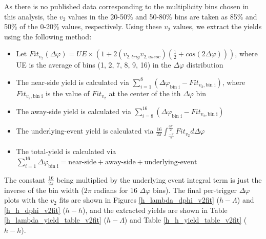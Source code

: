 \documentclass[ALICE,manyauthors]{ALICE_analysis_notes}
\begin{document}
As there is no published data corresponding to the multiplicity bins chosen in this analysis, the $v_{2}$ values in the 20-50\% and 50-80\% bins are taken as 85\% and 50\% of the 0-20\% values, respectively. Using these $v_{2}$ values, we extract the yields using the following method:

\begin{itemize}
\item Let $Fit_{v_{2}}(\Delta\varphi) = UE\times(1 + 2(v_{2, trig}v_{2, assoc})(\frac{1}{2} + cos(2\Delta\varphi)))$, where UE is the average of bins (1, 2, 7, 8, 9, 16) in the $\Delta\varphi$ distribution
\item The near-side yield is calculated via $\sum_{i=1}^{8} (\Delta\varphi_\text{bin i} - Fit_{v_{2}, \text{bin i}})$, where $Fit_{v_{2}, \text{bin i}}$ is the value of $Fit_{v_{2}}$ at the center of the ith $\Delta\varphi$ bin
\item The away-side yield is calculated via $\sum_{i=8}^{16} (\Delta\varphi_\text{bin i} - Fit_{v_{2}, \text{bin i}})$
\item The underlying-event yield is calculated via $\frac{16}{2\pi}\int_{\frac{-\pi}{2}}^{\frac{3\pi}{2}} Fit_{v_{2}} d\Delta\varphi$
\item The total-yield is calculated via $\sum_{i=1}^{16} \Delta\varphi_\text{bin i} = \text{near-side} + \text{away-side} + \text{underlying-event}$
\end{itemize}

The constant $\frac{16}{2\pi}$ being multiplied by the underlying event integral term is just the inverse of the bin width ($2\pi$ radians for 16 $\Delta\varphi$ bins). The final per-trigger $\Delta\varphi$ plots with the $v_{2}$ fits are shown in Figures \ref{h_lambda_dphi_v2fit} ($h-\Lambda$) and \ref{h_h_dphi_v2fit} ($h-h$), and the extracted yields are shown in Table \ref{h_lambda_yield_table_v2fit} ($h-\Lambda$) and Table \ref{h_h_yield_table_v2fit} ($h-h$). 
\end{document}
